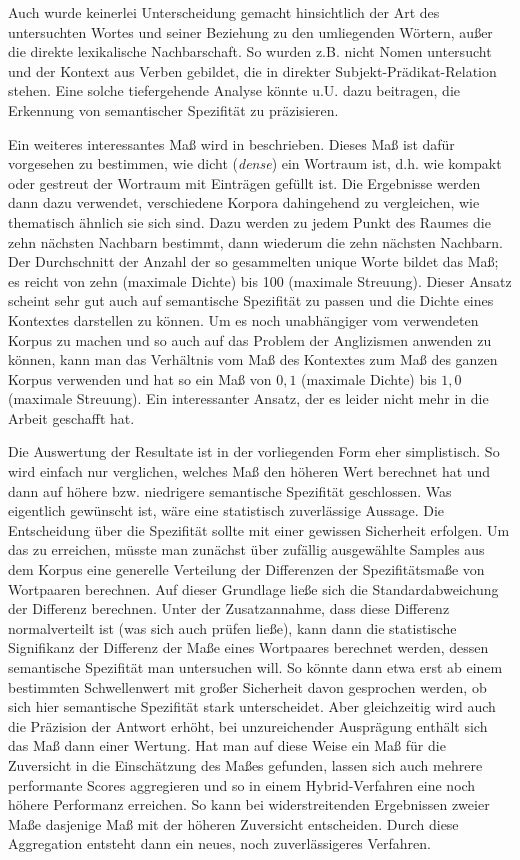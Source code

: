 \documentclass[11pt,numbers=noenddot]{scrartcl}
\begin{document}
Auch wurde keinerlei Unterscheidung gemacht hinsichtlich der Art des untersuchten Wortes und seiner Beziehung zu den umliegenden Wörtern, außer die direkte lexikalische Nachbarschaft. So wurden z.B. nicht Nomen untersucht und der Kontext aus Verben gebildet, die in direkter Subjekt-Prädikat-Relation stehen. Eine solche tiefergehende Analyse könnte u.U. dazu beitragen, die Erkennung von semantischer Spezifität zu präzisieren.

Ein weiteres interessantes Maß wird in \citet{Sahlgren2005} beschrieben. Dieses Maß ist dafür vorgesehen zu bestimmen, wie dicht (\emph{dense}) ein Wortraum ist, d.h. wie kompakt oder gestreut der Wortraum mit Einträgen gefüllt ist. Die Ergebnisse werden dann dazu verwendet, verschiedene Korpora dahingehend zu vergleichen, wie thematisch ähnlich sie sich sind. Dazu werden zu jedem Punkt des Raumes die zehn nächsten Nachbarn bestimmt, dann wiederum die zehn nächsten Nachbarn. Der Durchschnitt der Anzahl der so gesammelten unique Worte bildet das Maß; es reicht von zehn (maximale Dichte) bis 100 (maximale Streuung). Dieser Ansatz scheint sehr gut auch auf semantische Spezifität zu passen und die Dichte eines Kontextes darstellen zu können. Um es noch unabhängiger vom verwendeten Korpus zu machen und so auch auf das Problem der Anglizismen anwenden zu können, kann man das Verhältnis vom Maß des Kontextes zum Maß des ganzen Korpus verwenden und hat so ein Maß von $0,1$ (maximale Dichte) bis $1,0$ (maximale Streuung). Ein interessanter Ansatz, der es leider nicht mehr in die Arbeit geschafft hat.

Die Auswertung der Resultate ist in der vorliegenden Form eher simplistisch. So wird einfach nur verglichen, welches Maß den höheren Wert berechnet hat und dann auf höhere bzw. niedrigere semantische Spezifität geschlossen. Was eigentlich gewünscht ist, wäre eine statistisch zuverlässige Aussage. Die Entscheidung über die Spezifität sollte mit einer gewissen Sicherheit erfolgen. Um das zu erreichen, müsste man zunächst über zufällig ausgewählte Samples aus dem Korpus eine generelle Verteilung der Differenzen der Spezifitätsmaße von Wortpaaren berechnen. Auf dieser Grundlage ließe sich die Standardabweichung der Differenz berechnen. Unter der Zusatzannahme, dass diese Differenz normalverteilt ist (was sich auch prüfen ließe), kann dann die statistische Signifikanz der Differenz der Maße eines Wortpaares berechnet werden, dessen semantische Spezifität man untersuchen will. So könnte dann etwa erst ab einem bestimmten Schwellenwert mit großer Sicherheit davon gesprochen werden, ob sich hier semantische Spezifität stark unterscheidet. Aber gleichzeitig wird auch die Präzision der Antwort erhöht, bei unzureichender Ausprägung enthält sich das Maß dann einer Wertung. Hat man auf diese Weise ein Maß für die Zuversicht in die Einschätzung des Maßes gefunden, lassen sich auch mehrere performante Scores aggregieren und so in einem Hybrid-Verfahren eine noch höhere Performanz erreichen. So kann bei widerstreitenden Ergebnissen zweier Maße dasjenige Maß mit der höheren Zuversicht entscheiden. Durch diese Aggregation entsteht dann ein neues, noch zuverlässigeres Verfahren.
\end{document}

